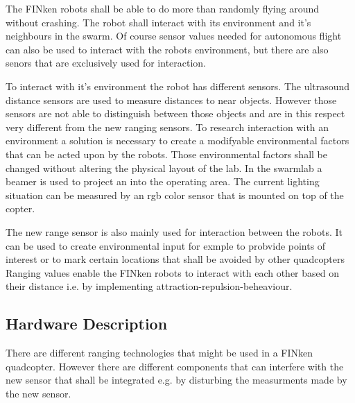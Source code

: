 The FINken robots shall be able to do more than randomly flying around without crashing.
The robot shall interact with its environment and it's neighbours in the swarm.
Of course sensor values needed for autonomous flight can also be used to interact with the robots environment, but there are also senors that are exclusively used for interaction.

To interact with it's environment the robot has different sensors.
The ultrasound distance sensors are used to measure distances to near objects.
However those sensors are not able to distinguish between those objects and are in this respect very different from the new ranging sensors.
To research interaction with an environment a solution is necessary to create a modifyable environmental factors that can be acted upon by the robots.
Those environmental factors shall be changed without altering the physical layout of the lab.
In the swarmlab a beamer is used to project an into the operating area.
The current lighting situation can be measured by an rgb color sensor that is mounted on top of the copter.

The new range sensor is also mainly used for interaction between the robots.
It can be used to create environmental input for exmple to probvide points of interest or to mark certain locations that shall be avoided by other quadcopters
Ranging values enable the FINken robots to interact with each other based on their distance i.e. by implementing attraction-repulsion-beheaviour. 

\subsection{Hardware Description}
There are different ranging technologies that might be used in a FINken quadcopter.
However there are different components that can interfere with the new sensor that shall be integrated e.g. by disturbing the measurments made by the new sensor.


